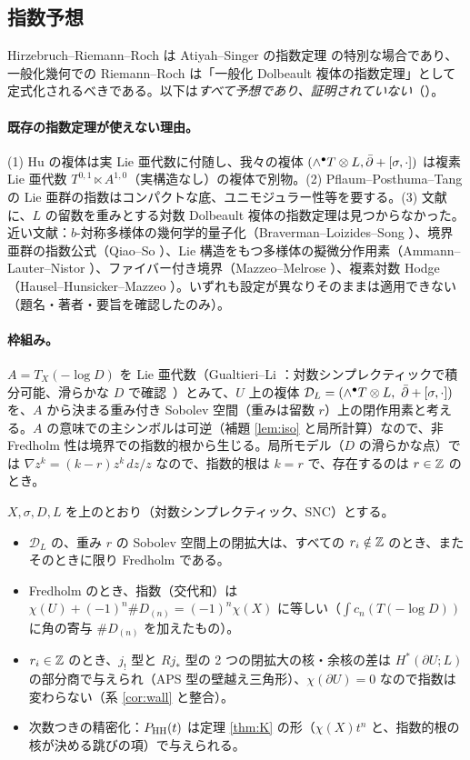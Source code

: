 \subsection{指数予想}
Hirzebruch--Riemann--Roch は Atiyah--Singer の指数定理 \cite{AS} の特別な場合であり、一般化幾何での Riemann--Roch は「一般化 Dolbeault 複体の指数定理」として定式化されるべきである。以下は\emph{すべて予想であり、証明されていない}（\tK）。

\paragraph{既存の指数定理が使えない理由。}(1) Hu \cite{Hu2} の複体は実 Lie 亜代数に付随し、我々の複体 $(\wedge^\bullet T\otimes L,\bar\partial+[\sigma,\cdot])$ は複素 Lie 亜代数 $T^{0,1}\ltimes A^{1,0}$（実構造なし）の複体で別物。(2) Pflaum--Posthuma--Tang \cite{PPT} の Lie 亜群の指数はコンパクトな底、ユニモジュラー性等を要する\tQ。(3) 文献に、$L$ の留数を重みとする対数 Dolbeault 複体の指数定理は見つからなかった。近い文献：$b$-対称多様体の幾何学的量子化（Braverman--Loizides--Song \cite{BLS}）、境界亜群の指数公式（Qiao--So \cite{QS}）、Lie 構造をもつ多様体の擬微分作用素（Ammann--Lauter--Nistor \cite{ALN}）、ファイバー付き境界（Mazzeo--Melrose \cite{MM}）、複素対数 Hodge（Hausel--Hunsicker--Mazzeo \cite{HHM}）。いずれも設定が異なりそのままは適用できない（題名・著者・要旨を確認したのみ\tQ）。

\paragraph{枠組み。}$A=T_X(-\log D)$ を Lie 亜代数（Gualtieri--Li \cite{GL}：対数シンプレクティックで積分可能、滑らかな $D$ で確認\tC\ \tQ）とみて、$U$ 上の複体 $\mathcal D_L=(\wedge^\bullet T\otimes L,\ \bar\partial+[\sigma,\cdot])$ を、$A$ から決まる重み付き Sobolev 空間（重みは留数 $r$）上の閉作用素と考える。$A$ の意味での主シンボルは可逆（補題 \ref{lem:iso} と局所計算\tV）なので、非 Fredholm 性は境界での指数的根から生じる。局所モデル（$D$ の滑らかな点）では $\nabla z^k=(k-r)z^k\,dz/z$ なので、指数的根は $k=r$ で、存在するのは $r\in\mathbb Z$ のとき。

\begin{conj}[指数予想]\tK\label{conj:index}
$X,\sigma,D,L$ を上のとおり（対数シンプレクティック、SNC）とする。
\begin{itemize}
\item[(I1)] $\mathcal D_L$ の、重み $r$ の Sobolev 空間上の閉拡大は、すべての $r_i\notin\mathbb Z$ のとき、またそのときに限り Fredholm である。
\item[(I2)] Fredholm のとき、指数（交代和）は $\chi(U)+(-1)^n\#D_{(n)}=(-1)^n\chi(X)$ に等しい（$\int c_n(T(-\log D))$ に角の寄与 $\#D_{(n)}$ を加えたもの）。
\item[(I3)] $r_i\in\mathbb Z$ のとき、$j_!$ 型と $Rj_*$ 型の 2 つの閉拡大の核・余核の差は $H^*(\partial U;L)$ の部分商で与えられ（APS 型の壁越え三角形）、$\chi(\partial U)=0$ なので指数は変わらない（系 \ref{cor:wall} と整合）。
\item[(I4)] 次数つきの精密化：$P_{\mathrm{HH}}(t)$ は定理 \ref{thm:K} の形（$\chi(X)t^n$ と、指数的根の核が決める跳びの項）で与えられる。
\end{itemize}
\end{conj}
